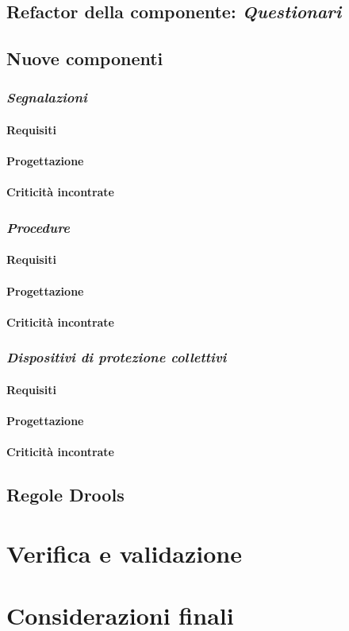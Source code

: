 \subsection{Refactor della componente: \textit{Questionari}}


\subsection{Nuove componenti}
\subsubsection{\textit{Segnalazioni}}
	\paragraph{Requisiti}
	\paragraph{Progettazione}
	\paragraph{Criticità incontrate}
\subsubsection{\textit{Procedure}}
	\paragraph{Requisiti}
	\paragraph{Progettazione}
	\paragraph{Criticità incontrate}
\subsubsection{\textit{Dispositivi di protezione collettivi}}
	\paragraph{Requisiti}
	\paragraph{Progettazione}
	\paragraph{Criticità incontrate}
		


\subsection{Regole Drools}
	
\section{Verifica e validazione}
\section{Considerazioni finali}
